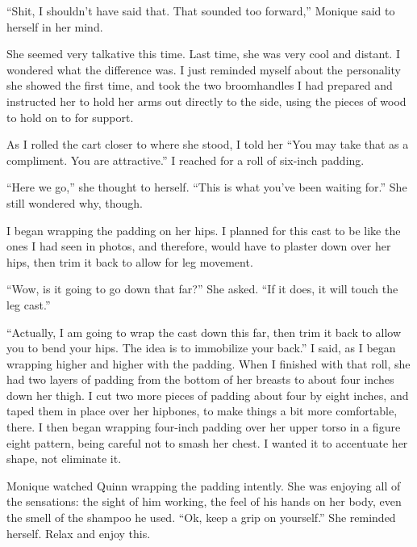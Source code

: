 \begin{thought}
``Shit, I shouldn't have said that. That sounded too forward,'' Monique said to herself in her
mind.
\end{thought}

She seemed very talkative this time. Last time, she was very cool and distant. I wondered
what the difference was. I just reminded myself about the personality she showed the first time,
and took the two broomhandles I had prepared and instructed her to hold her arms out directly to
the side, using the pieces of wood to hold on to for support.

As I rolled the cart closer to where she stood, I told her ``You may take that as a
compliment. You are attractive.'' I reached for a roll of six-inch padding.

\begin{thought}
``Here we go,'' she thought to herself. ``This is what you've been waiting for.'' She still
wondered why, though.
\end{thought}

I began wrapping the padding on her hips. I planned for this cast to be like the ones I had
seen in photos, and therefore, would have to plaster down over her hips, then trim it back to
allow for leg movement.

``Wow, is it going to go down that far?'' She asked. ``If it does, it will touch the leg cast.''

``Actually, I am going to wrap the cast down this far, then trim it back to allow you to bend
your hips. The idea is to immobilize your back.'' I said, as I began wrapping higher and higher
with the padding. When I finished with that roll, she had two layers of padding from the bottom
of her breasts to about four inches down her thigh. I cut two more pieces of padding about four
by eight inches, and taped them in place over her hipbones, to make things a bit more
comfortable, there. I then began wrapping four-inch padding over her upper torso in a figure
eight pattern, being careful not to smash her chest. I wanted it to accentuate her shape, not
eliminate it.

\begin{thought}
Monique watched Quinn wrapping the padding intently. She was enjoying all of the sensations:
the sight of him working, the feel of his hands on her body, even the smell of the shampoo he
used. ``Ok, keep a grip on yourself.'' She reminded herself. Relax and enjoy this.
\end{thought}

